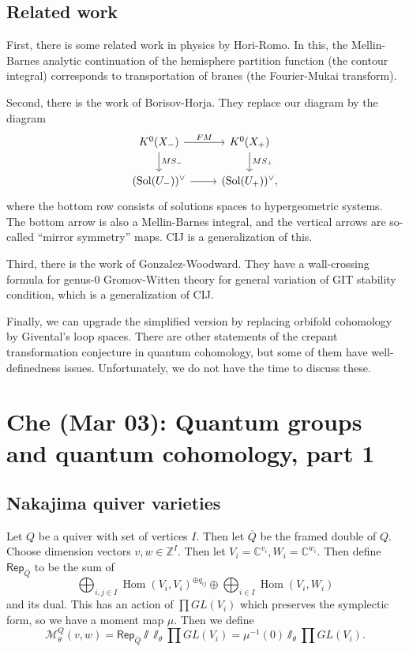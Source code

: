 \documentclass[leqno, openany]{memoir}
\theoremstyle{definition}
\theoremstyle{remark}
\theoremstyle{plain}
\theoremstyle{definition}
\theoremstyle{remark}
\newcommand{\C}{\mathbb{C}}
\newcommand{\Z}{\mathbb{Z}}
\newcommand{\mc}[1]{\mathcal{#1}}
\newcommand{\ms}[1]{\mathsf{#1}}
\newcommand{\on}[1]{\operatorname{#1}}
\newcommand{\ol}[1]{\overline{#1}}
\DeclareMathOperator{\Hom}{Hom}
\begin{document}
\section{Related work}

First, there is some related work in physics by Hori-Romo. In this, the Mellin-Barnes analytic continuation of the hemisphere partition function (the contour integral) corresponds to transportation of branes (the Fourier-Mukai transform).

Second, there is the work of Borisov-Horja. They replace our diagram by the diagram
\begin{equation*}
\begin{tikzcd}
    K^0(X_-) \ar{r}{FM} \ar{d}{MS_-} & K^0(X_+) \ar{d}{MS_+} \\
    (\on{Sol}(U_-))^{\vee} \ar{r} & (\on{Sol}(U_+))^{\vee},
\end{tikzcd}
\end{equation*}
where the bottom row consists of solutions spaces to hypergeometric systems. The bottom arrow is also a Mellin-Barnes integral, and the vertical arrows are so-called ``mirror symmetry'' maps. CIJ is a generalization of this.

Third, there is the work of Gonzalez-Woodward. They have a wall-crossing formula for genus-0 Gromov-Witten theory for general variation of GIT stability condition, which is a generalization of CIJ.

Finally, we can upgrade the simplified version by replacing orbifold cohomology by Givental's loop spaces. There are other statements of the crepant transformation conjecture in quantum cohomology, but some of them have well-definedness issues. Unfortunately, we do not have the time to discuss these.

\chapter{Che (Mar 03): Quantum groups and quantum cohomology, part 1}%

\section{Nakajima quiver varieties}

Let $Q$ be a quiver with set of vertices $I$. Then let $\ol{Q}$ be the framed double of $Q$. Choose dimension vectors $v, w \in \Z^I$. Then let $V_i = \C^{v_i}, W_i = \C^{w_i}$. Then define $\ms{Rep}_{\ol{Q}}$ to be the sum of
\[ \bigoplus_{i, j \in I} \Hom(V_i, V_i)^{\oplus q_{ij}} \oplus \bigoplus_{i \in I} \Hom(V_i, W_i) \]
and its dual. This has an action of $\prod GL(V_i)$ which preserves the symplectic form, so we have a moment map $\mu$. Then we define
\[ \mc{M}_{\theta}^Q(v, w) = \ms{Rep}_{\ol{Q}} \sslash \sslash_{\theta} \prod GL(V_i) = \mu^{-1}(0) \sslash_{\theta} \prod GL(V_i). \]
\end{document}
